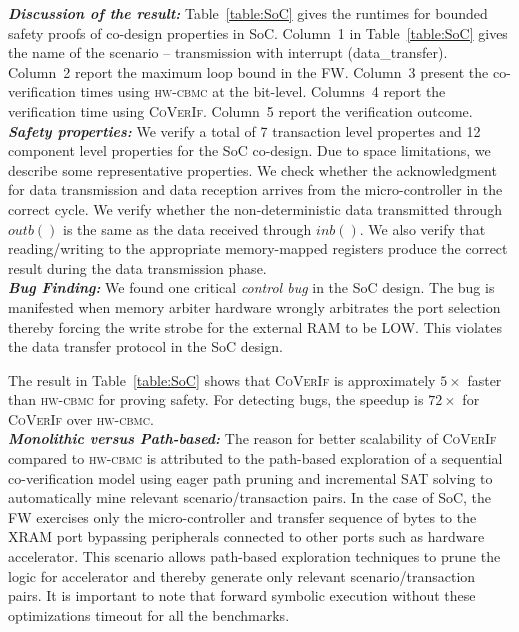 \documentclass[sigconf]{acmart}
\newcommand{\tool}[1]{\textsc{#1}\xspace}
\newcommand{\hwcbmcv}{\tool{hw-cbmc}}
\newcommand{\verifox}{\tool{CoVerIf}}
\begin{document}
%
\textbf{\emph{Discussion of the result:}}
%
Table~\ref{table:SoC} gives the runtimes for bounded safety proofs of 
co-design properties in SoC.  Column~1 in
Table~\ref{table:SoC} gives the name of the scenario -- transmission with
interrupt (data\_transfer).  Column~2 report the maximum loop bound in the 
FW.  Column~3 present the co-verification times using \hwcbmcv
at the bit-level.  Columns~4 report the verification time using \verifox. 
Column~5 report the verification outcome. \\
\textbf{\emph{Safety properties:}}
%
We verify a total of 7 transaction level propertes and 12 
component level properties for the SoC co-design.  Due to space 
limitations, we describe some representative properties.  We check
whether the acknowledgment for data transmission and data reception arrives
from the micro-controller in the correct cycle.  We verify whether the
non-deterministic data transmitted through $outb()$ is the same as 
the data received through $inb()$.  We also verify that
reading/writing to the appropriate memory-mapped registers produce the
correct result during the data transmission phase.\\ 
\textbf{\emph{Bug Finding:}} We found one critical \emph{control bug} 
in the SoC design.  The bug is manifested when memory arbiter hardware 
wrongly arbitrates the port selection thereby forcing the write strobe 
for the external RAM to be LOW.  This violates the data transfer protocol 
in the SoC design.

The result in Table~\ref{table:SoC} shows that \verifox is approximately
$5\times$ faster than \hwcbmcv for proving safety.  For detecting bugs, 
the speedup is $72\times$ for \verifox over \hwcbmcv. \\ 
\textbf{\emph{Monolithic versus Path-based:}}
The reason for better scalability of \verifox compared to 
\hwcbmcv is attributed to the path-based exploration of a 
sequential co-verification model using eager path pruning and 
incremental SAT solving to automatically mine relevant scenario/transaction
pairs.  In the case of SoC, the FW exercises only the micro-controller 
and transfer sequence of bytes to the XRAM port bypassing peripherals 
connected to other ports such as hardware accelerator.  
This scenario allows path-based exploration techniques to prune the logic for
accelerator and thereby generate only relevant scenario/transaction pairs.  It 
is important to note that forward symbolic execution without these optimizations 
timeout for all the benchmarks.
\end{document}
